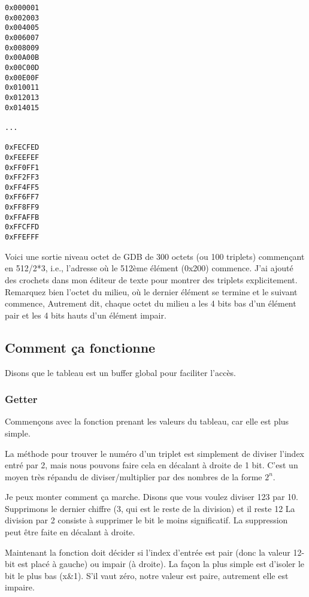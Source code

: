 \begin{lstlisting}
0x000001
0x002003
0x004005
0x006007
0x008009
0x00A00B
0x00C00D
0x00E00F
0x010011
0x012013
0x014015

...

0xFECFED
0xFEEFEF
0xFF0FF1
0xFF2FF3
0xFF4FF5
0xFF6FF7
0xFF8FF9
0xFFAFFB
0xFFCFFD
0xFFEFFF
\end{lstlisting}

Voici une sortie niveau octet de GDB de 300 octets (ou 100 triplets) commençant en
512/2*3, i.e., l'adresse où le 512ème élément (0x200) commence.
J'ai ajouté des crochets dans mon éditeur de texte pour montrer des triplets explicitement.
Remarquez bien l'octet du milieu, où le dernier élément se termine et le suivant commence,
Autrement dit, chaque octet du milieu a les 4 bits bas d'un élément pair et les 4
bits hauts d'un élément impair.



\subsection{Comment ça fonctionne}

Disons que le tableau est un buffer global pour faciliter l'accès.

\subsubsection{Getter}

Commençons avec la fonction prenant les valeurs du tableau, car elle est plus simple.

La méthode pour trouver le numéro d'un triplet est simplement de diviser l'index
entré par 2, mais nous pouvons faire cela en décalant à droite de 1 bit.
C'est un moyen très répandu de diviser/multiplier par des nombres de la forme $2^n$.

Je peux monter comment ça marche. Disons que vous voulez diviser 123 par 10.
Supprimons le dernier chiffre (3, qui est le reste de la division) et il reste 12
La division par 2 consiste à supprimer le bit le moins significatif. La suppression
peut être faite en décalant à droite.

Maintenant la fonction doit décider si l'index d'entrée est pair (donc la valeur
12-bit est placé à gauche) ou impair (à droite).
La façon la plus simple est d'isoler le bit le plus bas (x\&1). S'il vaut zéro, notre
valeur est paire, autrement elle est impaire.


